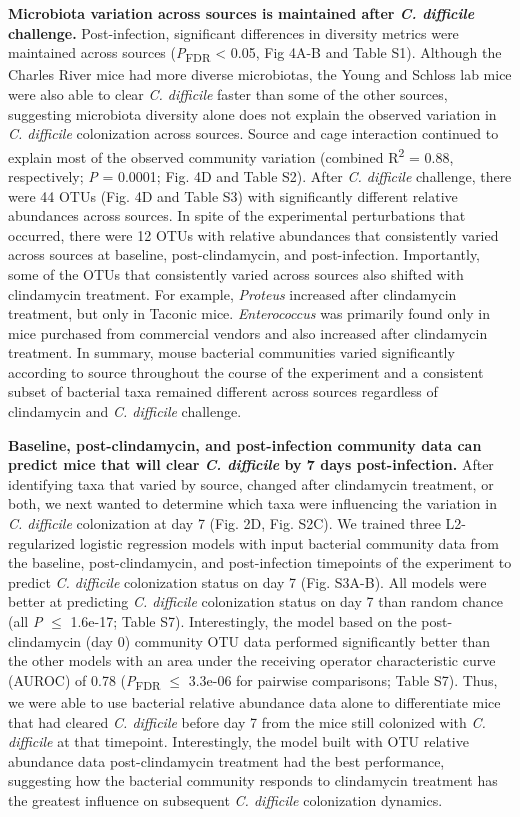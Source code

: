 \documentclass[11pt,]{article}
\begin{document}
\textbf{Microbiota variation across sources is maintained after \emph{C.
difficile} challenge.} Post-infection, significant differences in
diversity metrics were maintained across sources
(\emph{P}\textsubscript{FDR} \textless{} 0.05, Fig 4A-B and Table S1).
Although the Charles River mice had more diverse microbiotas, the Young
and Schloss lab mice were also able to clear \emph{C. difficile} faster
than some of the other sources, suggesting microbiota diversity alone
does not explain the observed variation in \emph{C. difficile}
colonization across sources. Source and cage interaction continued to
explain most of the observed community variation (combined
R\textsuperscript{2} = 0.88, respectively; \emph{P} = 0.0001; Fig. 4D
and Table S2). After \emph{C. difficile} challenge, there were 44 OTUs
(Fig. 4D and Table S3) with significantly different relative abundances
across sources. In spite of the experimental perturbations that
occurred, there were 12 OTUs with relative abundances that consistently
varied across sources at baseline, post-clindamycin, and post-infection.
Importantly, some of the OTUs that consistently varied across sources
also shifted with clindamycin treatment. For example, \emph{Proteus}
increased after clindamycin treatment, but only in Taconic mice.
\emph{Enterococcus} was primarily found only in mice purchased from
commercial vendors and also increased after clindamycin treatment. In
summary, mouse bacterial communities varied significantly according to
source throughout the course of the experiment and a consistent subset
of bacterial taxa remained different across sources regardless of
clindamycin and \emph{C. difficile} challenge.

\textbf{Baseline, post-clindamycin, and post-infection community data
can predict mice that will clear \emph{C. difficile} by 7 days
post-infection.} After identifying taxa that varied by source, changed
after clindamycin treatment, or both, we next wanted to determine which
taxa were influencing the variation in \emph{C. difficile} colonization
at day 7 (Fig. 2D, Fig. S2C). We trained three L2-regularized logistic
regression models with input bacterial community data from the baseline,
post-clindamycin, and post-infection timepoints of the experiment to
predict \emph{C. difficile} colonization status on day 7 (Fig. S3A-B).
All models were better at predicting \emph{C. difficile} colonization
status on day 7 than random chance (all \emph{P} \(\le\) 1.6e-17; Table
S7). Interestingly, the model based on the post-clindamycin (day 0)
community OTU data performed significantly better than the other models
with an area under the receiving operator characteristic curve (AUROC)
of 0.78 (\emph{P}\textsubscript{FDR} \(\le\) 3.3e-06 for pairwise
comparisons; Table S7). Thus, we were able to use bacterial relative
abundance data alone to differentiate mice that had cleared \emph{C.
difficile} before day 7 from the mice still colonized with \emph{C.
difficile} at that timepoint. Interestingly, the model built with OTU
relative abundance data post-clindamycin treatment had the best
performance, suggesting how the bacterial community responds to
clindamycin treatment has the greatest influence on subsequent \emph{C.
difficile} colonization dynamics.
\end{document}
